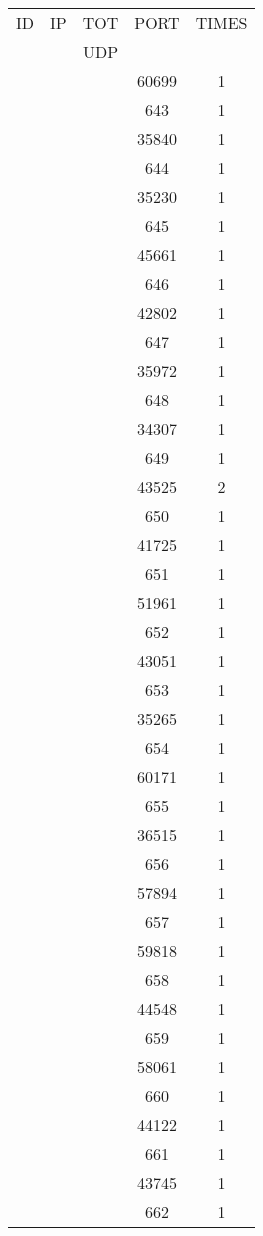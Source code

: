 \documentclass[a4paper]{scrartcl}
\begin{document}
\begin{minipage}[b]{0.5\linewidth}
\begin{tabular}{| c | c | c | c | c |}
\hline
ID & IP & TOT & PORT & TIMES \\ 
   &    & UDP &      &       \\ 
\hline
& & & 60699 & 1 \\ & & & 643 & 1 \\ & & & 35840 & 1 \\ & & & 644 & 1 \\ & & & 35230 & 1 \\ & & & 645 & 1 \\ & & & 45661 & 1 \\ & & & 646 & 1 \\ & & & 42802 & 1 \\ & & & 647 & 1 \\ & & & 35972 & 1 \\ & & & 648 & 1 \\ & & & 34307 & 1 \\ & & & 649 & 1 \\ & & & 43525 & 2 \\ & & & 650 & 1 \\ & & & 41725 & 1 \\ & & & 651 & 1 \\ & & & 51961 & 1 \\ & & & 652 & 1 \\ & & & 43051 & 1 \\ & & & 653 & 1 \\ & & & 35265 & 1 \\ & & & 654 & 1 \\ & & & 60171 & 1 \\ & & & 655 & 1 \\ & & & 36515 & 1 \\ & & & 656 & 1 \\ & & & 57894 & 1 \\ & & & 657 & 1 \\ & & & 59818 & 1 \\ & & & 658 & 1 \\ & & & 44548 & 1 \\ & & & 659 & 1 \\ & & & 58061 & 1 \\ & & & 660 & 1 \\ & & & 44122 & 1 \\ & & & 661 & 1 \\ & & & 43745 & 1 \\ & & & 662 & 1 \\ \hline\end{tabular}\end{minipage} \hfill\begin{minipage}[b]{0.5\linewidth}\begin{tabular}{| c | c | c | c | c |}

\end{tabular}
\end{minipage}
\end{document}

